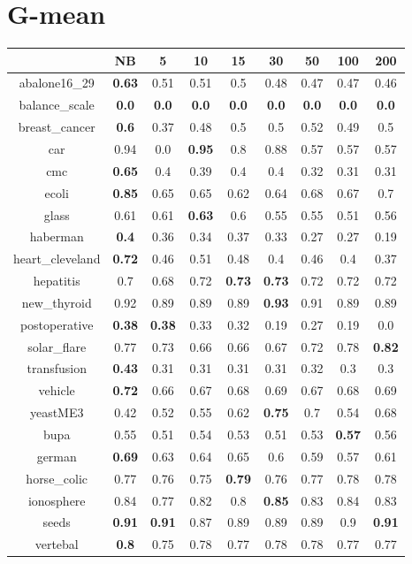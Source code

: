 \documentclass{article}%
\begin{document}
%
\section*{G{-}mean}%
\begin{tabular}{c|cccccccc}%
\hline%
&NB&5&10&15&30&50&100&200\\%
\hline%
abalone16\_29&\textbf{0.63}&0.51&0.51&0.5&0.48&0.47&0.47&0.46\\%
\hline%
balance\_scale&\textbf{0.0}&\textbf{0.0}&\textbf{0.0}&\textbf{0.0}&\textbf{0.0}&\textbf{0.0}&\textbf{0.0}&\textbf{0.0}\\%
\hline%
breast\_cancer&\textbf{0.6}&0.37&0.48&0.5&0.5&0.52&0.49&0.5\\%
\hline%
car&0.94&0.0&\textbf{0.95}&0.8&0.88&0.57&0.57&0.57\\%
\hline%
cmc&\textbf{0.65}&0.4&0.39&0.4&0.4&0.32&0.31&0.31\\%
\hline%
ecoli&\textbf{0.85}&0.65&0.65&0.62&0.64&0.68&0.67&0.7\\%
\hline%
glass&0.61&0.61&\textbf{0.63}&0.6&0.55&0.55&0.51&0.56\\%
\hline%
haberman&\textbf{0.4}&0.36&0.34&0.37&0.33&0.27&0.27&0.19\\%
\hline%
heart\_cleveland&\textbf{0.72}&0.46&0.51&0.48&0.4&0.46&0.4&0.37\\%
\hline%
hepatitis&0.7&0.68&0.72&\textbf{0.73}&\textbf{0.73}&0.72&0.72&0.72\\%
\hline%
new\_thyroid&0.92&0.89&0.89&0.89&\textbf{0.93}&0.91&0.89&0.89\\%
\hline%
postoperative&\textbf{0.38}&\textbf{0.38}&0.33&0.32&0.19&0.27&0.19&0.0\\%
\hline%
solar\_flare&0.77&0.73&0.66&0.66&0.67&0.72&0.78&\textbf{0.82}\\%
\hline%
transfusion&\textbf{0.43}&0.31&0.31&0.31&0.31&0.32&0.3&0.3\\%
\hline%
vehicle&\textbf{0.72}&0.66&0.67&0.68&0.69&0.67&0.68&0.69\\%
\hline%
yeastME3&0.42&0.52&0.55&0.62&\textbf{0.75}&0.7&0.54&0.68\\%
\hline%
bupa&0.55&0.51&0.54&0.53&0.51&0.53&\textbf{0.57}&0.56\\%
\hline%
german&\textbf{0.69}&0.63&0.64&0.65&0.6&0.59&0.57&0.61\\%
\hline%
horse\_colic&0.77&0.76&0.75&\textbf{0.79}&0.76&0.77&0.78&0.78\\%
\hline%
ionosphere&0.84&0.77&0.82&0.8&\textbf{0.85}&0.83&0.84&0.83\\%
\hline%
seeds&\textbf{0.91}&\textbf{0.91}&0.87&0.89&0.89&0.89&0.9&\textbf{0.91}\\%
\hline%
vertebal&\textbf{0.8}&0.75&0.78&0.77&0.78&0.78&0.77&0.77\\%
\hline%
\end{tabular}

%
\end{document}
